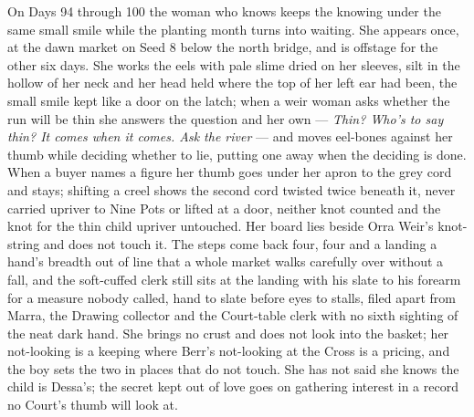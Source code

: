 \documentclass{design/chronicle}
\begin{document}
{On Days 94 through 100 the woman who knows keeps the knowing under the same small smile while the planting month turns into waiting. She appears once, at the dawn market on Seed 8 below the north bridge, and is offstage for the other six days. She works the eels with pale slime dried on her sleeves, silt in the hollow of her neck and her head held where the top of her left ear had been, the small smile kept like a door on the latch; when a weir woman asks whether the run will be thin she answers the question and her own --- \emph{Thin? Who’s to say thin? It comes when it comes. Ask the river} --- and moves eel-bones against her thumb while deciding whether to lie, putting one away when the deciding is done. When a buyer names a figure her thumb goes under her apron to the grey cord and stays; shifting a creel shows the second cord twisted twice beneath it, never carried upriver to Nine Pots or lifted at a door, neither knot counted and the knot for the thin child upriver untouched. Her board lies beside Orra Weir’s knot-string and does not touch it. The steps come back four, four and a landing a hand’s breadth out of line that a whole market walks carefully over without a fall, and the soft-cuffed clerk still sits at the landing with his slate to his forearm for a measure nobody called, hand to slate before eyes to stalls, filed apart from Marra, the Drawing collector and the Court-table clerk with no sixth sighting of the neat dark hand. She brings no crust and does not look into the basket; her not-looking is a keeping where Berr’s not-looking at the Cross is a pricing, and the boy sets the two in places that do not touch. She has not said she knows the child is Dessa’s; the secret kept out of love goes on gathering interest in a record no Court’s thumb will look at.

}
\end{document}
